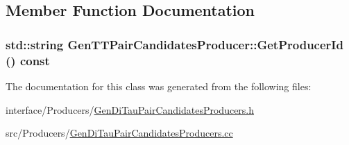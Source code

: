 \subsection{Member Function Documentation}
\hypertarget{classGenTTPairCandidatesProducer_afa844a16818746ebda6d486eaaf79ef2}{
\subsubsection[{GetProducerId}]{\setlength{\rightskip}{0pt plus 5cm}std::string GenTTPairCandidatesProducer::GetProducerId () const}}
\label{classGenTTPairCandidatesProducer_afa844a16818746ebda6d486eaaf79ef2}


The documentation for this class was generated from the following files:\begin{DoxyCompactItemize}
\item 
interface/Producers/\hyperlink{GenDiTauPairCandidatesProducers_8h}{GenDiTauPairCandidatesProducers.h}\item 
src/Producers/\hyperlink{GenDiTauPairCandidatesProducers_8cc}{GenDiTauPairCandidatesProducers.cc}\end{DoxyCompactItemize}

